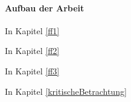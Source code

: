 \paragraph{Aufbau der Arbeit}
In Kapitel \vref{ff1} \par
In Kapitel \vref{ff2} \par
In Kapitel \vref{ff3} \par
In Kapitel \vref{kritischeBetrachtung}
